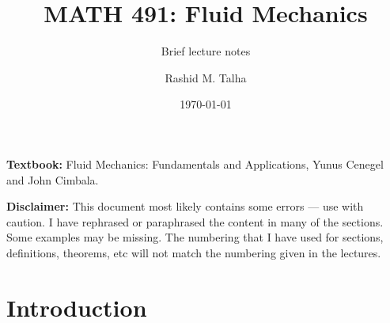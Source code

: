 \documentclass[11pt]{penrose}
\title{MATH 491: Fluid Mechanics}
\subtitle{Brief lecture notes}
\author{Rashid M. Talha}
\affiliation{School of Natural Sciences, NUST}
\date{\today}
\begin{document}
\maketitle

\textbf{Textbook:} Fluid Mechanics: Fundamentals and Applications, Yunus Cenegel and John Cimbala.

\textbf{Disclaimer:} This document most likely contains some errors --- use with caution. I have rephrased or paraphrased the content in many of the sections. Some examples may be missing. The numbering that I have used for sections, definitions, theorems, etc will not match the numbering given in the lectures.

\section{Introduction}
\end{document}
